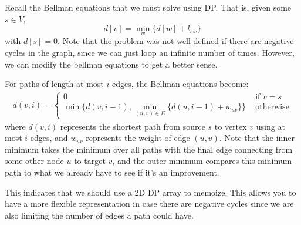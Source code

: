 \documentclass{article}
\begin{document}
    Recall the Bellman equations that we must solve using DP. That is, given some $s \in V$, 
    \begin{equation}
      d[v] = \min_w \{ d[w] + l_{wv} \}
    \end{equation}
    with $d[s] = 0$. Note that the problem was not well defined if there are negative cycles in the graph, since we can just loop an infinite number of times. However, we can modify the bellman equations to get a better sense. 

    \begin{theorem}
      For paths of length at most $i$ edges, the Bellman equations become:
      \begin{align}
        d(v,i) = \begin{cases} 
          0 & \text{ if } v = s \\
          \min\{d(v,i-1), \min_{(u, v) \in E} \{d(u,i-1) + w_{uv}\}\} & \text{ otherwise}
        \end{cases}
      \end{align}
      where $d(v,i)$ represents the shortest path from source $s$ to vertex $v$ using at most $i$ edges, and $w_{uv}$ represents the weight of edge $(u, v)$. Note that the inner minimum takes the minimum over all paths with the final edge connecting from some other node $u$ to target $v$, and the outer minimum compares this minimum path to what we already have to see if it's an improvement. 
    \end{theorem} 

    This indicates that we should use a 2D DP array to memoize. This allows you to have a more flexible representation in case there are negative cycles since we are also limiting the number of edges a path could have. 
\end{document}
